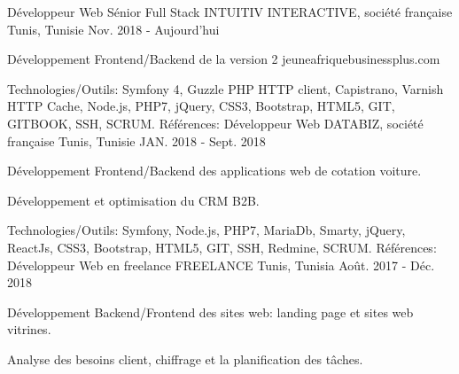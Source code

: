 \begin{cventries}
  \techentries
    {Développeur Web  Sénior Full Stack}
    {INTUITIV INTERACTIVE, société française}
    {Tunis, Tunisie}
    {Nov. 2018 - Aujourd'hui}
    {
      \begin{cvitems}
        \item {Développement Frontend/Backend de la version 2 jeuneafriquebusinessplus.com}    
      \end{cvitems}
    }
    {\textcolor{awesome}{Technologies/Outils: } {\color{graytext}}  {Symfony 4, Guzzle PHP HTTP client, Capistrano, Varnish HTTP Cache, Node.js, PHP7, jQuery, CSS3, Bootstrap, HTML5, GIT, GITBOOK, SSH, SCRUM.}}
    {Références:} 
    {
      \href{https://www.jeuneafriquebusinessplus.com/fr/}{} \break
    }
  \techentries
    {Développeur Web}
    {DATABIZ, société française}
    {Tunis, Tunisie}
    {JAN. 2018 - Sept. 2018}
    {
      \begin{cvitems}
		    \item {Développement Frontend/Backend des applications web de cotation voiture.}		
		    \item {Développement et optimisation du CRM B2B.}
      \end{cvitems}
    }
    {\textcolor{awesome}{Technologies/Outils: } {\color{graytext}}  {Symfony, Node.js, PHP7, MariaDb, Smarty, jQuery, ReactJs, CSS3, Bootstrap, HTML5, GIT, SSH, Redmine, SCRUM.}}
    {Références:} 
    {\href{https://www.reprise-citroen.fr/}{} \break
     \href{https://www.reprise-cash-bypeugeot.fr/}{} \break
     \href{https://www.reprise.dsautomobiles.fr/}{}\break
     \href{https://ankaufservice.renault.de/}{}\break
    }
  \techentries
    {Développeur Web en freelance}
    {FREELANCE}
    {Tunis, Tunisia}
    {Août. 2017 - Déc. 2018}
    {
      \begin{cvitems}
        \item {Développement Backend/Frontend des sites web: landing page et sites web vitrines.}
        \item {Analyse des besoins client, chiffrage et la planification des tâches.}

\end{cvitems}}
\end{cventries}
